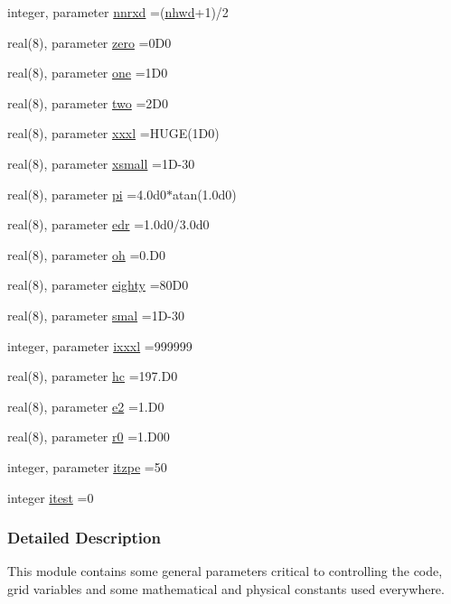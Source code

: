 \begin{DoxyCompactItemize}
integer, parameter \hyperlink{namespaceparamr_aae1715448aba3fff0e2cdf279c593f2b}{nnrxd} =(\hyperlink{namespaceparamr_a85e42468af30077429194d0dac1b9081}{nhwd}+1)/2
\item 
real(8), parameter \hyperlink{namespaceparamr_afe699408c9872c88006dfddc7e87e2da}{zero} =0\+D0
\item 
real(8), parameter \hyperlink{namespaceparamr_a3038617abc42e475c822dcf484e2082e}{one} =1\+D0
\item 
real(8), parameter \hyperlink{namespaceparamr_a58c4634badf6036e07adcbc71f2d3461}{two} =2\+D0
\item 
real(8), parameter \hyperlink{namespaceparamr_a6bf23a9b98d0c83e261277cb9bb303fb}{xxxl} =H\+U\+GE(1\+D0)
\item 
real(8), parameter \hyperlink{namespaceparamr_a876da96687a8b24b0621640d862bea99}{xsmall} =1\+D-\/30
\item 
real(8), parameter \hyperlink{namespaceparamr_a7e2dc20cc92d78c7f3473ce67b11d0f0}{pi} =4.\+0d0$\ast$atan(1.\+0d0)
\item 
real(8), parameter \hyperlink{namespaceparamr_ae6e80d7b541f9af7e87132564f1795c8}{edr} =1.\+0d0/3.\+0d0
\item 
real(8), parameter \hyperlink{namespaceparamr_aac25693e19c755d7f856ed0784043f4e}{oh} =0.\+D0
\item 
real(8), parameter \hyperlink{namespaceparamr_a193383fee42912673814402013918bb2}{eighty} =80\+D0
\item 
real(8), parameter \hyperlink{namespaceparamr_a4011c8cb7093e8daade112c2cc14f536}{smal} =1\+D-\/30
\item 
integer, parameter \hyperlink{namespaceparamr_a96850280b19dff419aec41c471f259fd}{ixxxl} =999999
\item 
real(8), parameter \hyperlink{namespaceparamr_ae307a42af690e6ee9306fffb321fac5f}{hc} =197.\+D0
\item 
real(8), parameter \hyperlink{namespaceparamr_a305f3e9e10b7124881dc1c614e2a46ad}{e2} =1.\+D0
\item 
real(8), parameter \hyperlink{namespaceparamr_a063c9af80ff448638de55fbf7a5a81b9}{r0} =1.\+D00
\item 
integer, parameter \hyperlink{namespaceparamr_a3793810490c9a71b1290280848f952ab}{itzpe} =50
\item 
integer \hyperlink{namespaceparamr_a52ac61adb92cf4788f93f3284fc94eea}{itest} =0
\end{DoxyCompactItemize}


\subsubsection{Detailed Description}
This module contains some general parameters critical to controlling the code, grid variables and some mathematical and physical constants used everywhere. 

